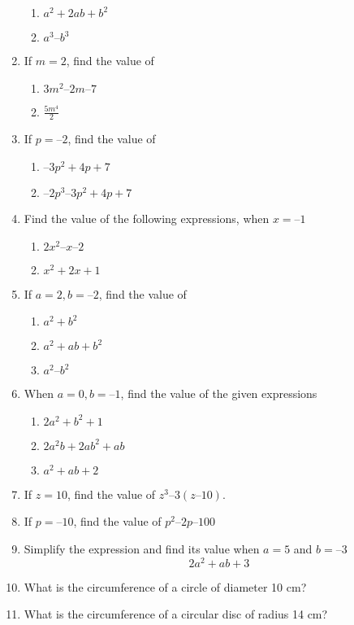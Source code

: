 \begin{enumerate}[label=\thesection.\arabic*, ref=\thesection.\theenumi]
	\begin{enumerate}
\item $ a^2+2ab+b^2$
\item $ a^3 – b^3$
\end{enumerate}
\item If $m = 2$, find the value of
	\begin{enumerate}
\item $ 3m^2 – 2m – 7 $
\item $ \frac{5m^4}{ 2}$
\end{enumerate}
\item  If $p = – 2$, find the value of
	\begin{enumerate}
\item  $– 3p^2 + 4p + 7 $
\item  $– 2p^3 – 3p^2 + 4p + 7$
\end{enumerate}
\item  Find the value of the following expressions, when $x = –1$ 
	\begin{enumerate}
\item $ 2x^2 – x – 2$
\item $ x^2 + 2x +1$
\end{enumerate}
\item  If $a = 2, b = – 2$, find the value of
	\begin{enumerate}
\item  $ a^2 + b^2$
\item  $a^2 + ab + b^2 $
\item  $a^2 – b^2$
\end{enumerate}
\item  When $a = 0, b = – 1$, find the value of the given expressions
	\begin{enumerate}
\item $2a^2 + b^2 + 1 $
\item $2a^2b + 2ab^2 + ab $
\item $a^2 + ab + 2$
\end{enumerate}
\item If $z = 10$, find the value of $z^3 – 3(z – 10)$. 
\item  If $p = – 10$, find the value of $p^2 – 2p – 100$
\item  Simplify the expression and find its value when $a = 5$ and $b = – 3$
	$$ 2a^2 + ab + 3 $$
\item What is the circumference of a circle of diameter 10 cm?
	\\
	\solution
	
\item What is the circumference of a circular disc of radius 14 cm?

\end{enumerate}
